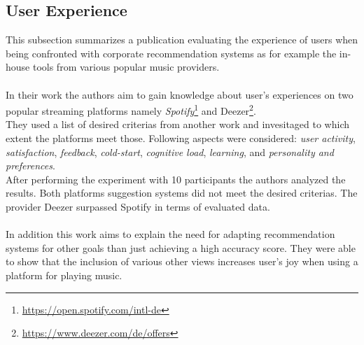 \documentclass[runningheads,a4paper]{llncs}
\begin{document}
\subsection{User Experience}
This subsection summarizes a publication evaluating the experience of users when being confronted with corporate recommendation systems as for example the in-house tools from various popular music providers.\\
\\
In their work \cite{de2022evaluating} the authors aim to gain knowledge about user's experiences on two popular streaming platforms namely 
\textit{Spotify}\footnote{\url{https://open.spotify.com/intl-de}} and Deezer\footnote{\url{https://www.deezer.com/de/offers}}. \\
They used a list of desired criterias from another work and invesitaged to which extent the platforms meet those.
Following aspects were considered:
\textit{user activity},
\textit{satisfaction},
\textit{feedback},
\textit{cold-start},
\textit{cognitive load},
\textit{learning},
and \textit{personality and preferences}.\\
After performing the experiment with 10 participants the authors analyzed the results.
Both platforms suggestion systems did not meet the desired criterias. 
The provider Deezer surpassed Spotify in terms of evaluated data. \\
\\
In addition this work aims to explain the need for adapting recommendation systems for other goals than just achieving a high accuracy score.
They were able to show that the inclusion of various other views increases user's joy when using a platform for playing music.
\end{document}

